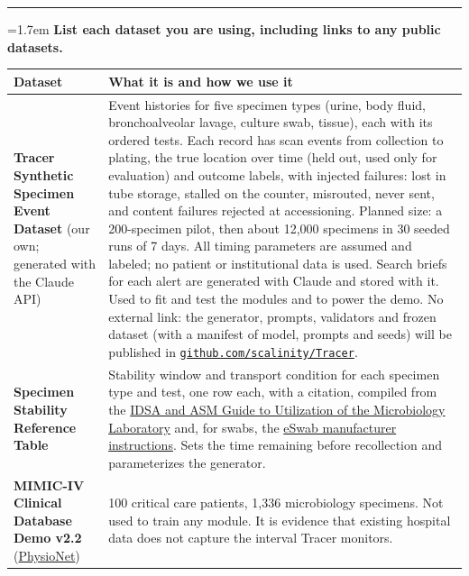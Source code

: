\documentclass[10pt]{article}
\newcommand{\qa}[2]{%
  \par\Needspace{6\baselineskip}\addvspace{0.75em}%
  {\color{hair}\rule{\textwidth}{0.5pt}}\par\nopagebreak\vspace{0.15em}%
  \noindent\hangindent=1.7em\hangafter=1
  {\sffamily\bfseries\color{tracerteal}\makebox[1.7em][l]{#1}\color{black}#2}\par\nopagebreak\vspace{0.1em}}
\newcommand{\repo}{\href{https://github.com/scalinity/Tracer}{\nolinkurl{github.com/scalinity/Tracer}}}
\begin{document}
\qa{7.}{List each dataset you are using, including links to any public datasets.}
\begin{longtable}{@{}L{0.21}L{0.73}@{}}
\toprule
\sffamily\small Dataset & \sffamily\small What it is and how we use it \\
\midrule
\endhead
\textbf{Tracer Synthetic Specimen Event Dataset} (our own; generated with the Claude API) &
  Event histories for five specimen types (urine, body fluid, bronchoalveolar lavage, culture swab, tissue), each with its
  ordered tests. Each record has scan events from collection to plating, the true location over time (held out, used
  only for evaluation) and outcome labels, with injected failures: lost in tube storage, stalled on the counter,
  misrouted, never sent, and content failures rejected at accessioning. Planned size: a 200-specimen pilot, then about
  12{,}000 specimens in 30 seeded runs of 7 days. All timing parameters are assumed and labeled; no patient or
  institutional data is used. Search briefs for each alert are generated with Claude and stored with it. Used to
  fit and test the modules and to power the demo. No external link: the generator, prompts, validators and frozen dataset
  (with a manifest of model, prompts and seeds) will be published in \repo. \\
\addlinespace
\textbf{Specimen Stability Reference Table} &
  Stability window and transport condition for each specimen type and test, one row each, with a citation, compiled from the
  \href{https://www.idsociety.org/practice-guideline/laboratory-diagnosis-of-infectious-diseases/}{IDSA and ASM Guide to
  Utilization of the Microbiology Laboratory} and, for swabs, the
  \href{https://www.copanusa.com/wp-content/uploads/2024/03/HPC030R05_PI-ESWAB-USA-2023.03.pdf}{eSwab manufacturer
  instructions}. Sets the time remaining before recollection and parameterizes the generator. \\
\addlinespace
\textbf{MIMIC-IV Clinical Database Demo v2.2} (\href{https://physionet.org/content/mimic-iv-demo/2.2/}{PhysioNet}) &
  100 critical care patients, 1,336 microbiology specimens. Not used to train any module. It is evidence that existing
  hospital data does not capture the interval Tracer monitors. \\
\bottomrule
\end{longtable}
\end{document}
